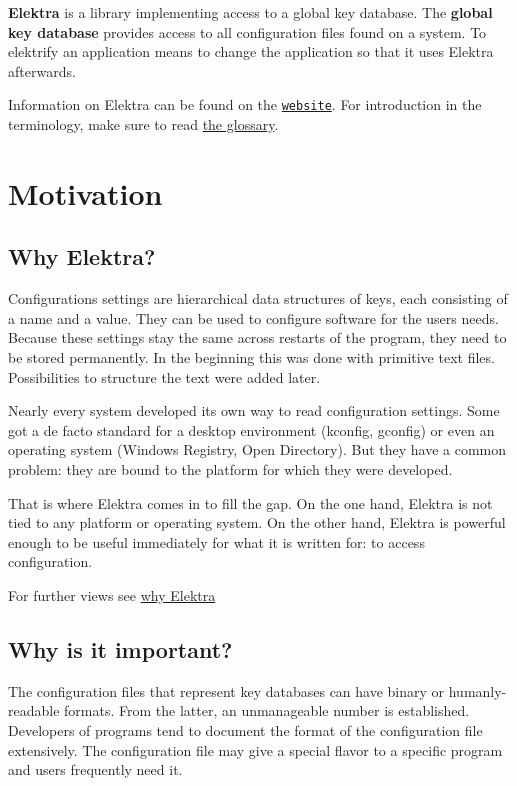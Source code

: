 {\bfseries Elektra} is a library implementing access to a global key database. The {\bfseries global key database} provides access to all configuration files found on a system. To elektrify an application means to change the application so that it uses Elektra afterwards.

Information on Elektra can be found on the \href{https://www.libelektra.org}{\tt website}. For introduction in the terminology, make sure to read \hyperlink{doc_help_elektra-glossary_md}{the glossary}.

\section*{Motivation}

\subsection*{Why Elektra?}

Configurations settings are hierarchical data structures of keys, each consisting of a name and a value. They can be used to configure software for the user\textquotesingle{}s needs. Because these settings stay the same across restarts of the program, they need to be stored permanently. In the beginning this was done with primitive text files. Possibilities to structure the text were added later.

Nearly every system developed its own way to read configuration settings. Some got a de facto standard for a desktop environment (kconfig, gconfig) or even an operating system (Windows Registry, Open Directory). But they have a common problem\+: they are bound to the platform for which they were developed.

That is where Elektra comes in to fill the gap. On the one hand, Elektra is not tied to any platform or operating system. On the other hand, Elektra is powerful enough to be useful immediately for what it is written for\+: to access configuration.

For further views see \hyperlink{doc_WHY_md}{why Elektra}

\subsection*{Why is it important?}

The configuration files that represent key databases can have binary or humanly-\/readable formats. From the latter, an unmanageable number is established. Developers of programs tend to document the format of the configuration file extensively. The configuration file may give a special flavor to a specific program and users frequently need it.


